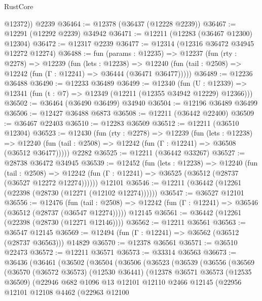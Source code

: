 \begin{lexlean}{RustCore}
\begin{coremodule}
        @12372))
    @2239
@36464 := @12378 (@36437 (@12228 @2239))
@36467 := @12291 (@12292 @2239) @34942
@36471 := @12211 (@12283 (@36467 @12300) @12304)
@36472 := @12317 @2239
@36477 := @12314 (@12316 @36472 @34945 @12272 @12274)
@36488 := fun (params : @12235) =>
  @12237
    (fun (rty : @2278) =>
    @12239
      (fun (lets : @12238) =>
      @12240 (fun (tail : @2508) => @12242 (fun (Γ : @12241) => @36444 (@36471 @36477)))))
@36489 := @12236 @36488
@36490 := @12233 @36489
@36499 := @12340
    (fun (U : @12339) => @12341 (fun (t : @7) => @12349 (@12211 (@12355 @34942 @12229) @12366)))
@36502 := @36464 (@36490 @36499) @34940
@36504 := @12196 @36489 @36499
@36506 := @12427 @36488 @6873
@36508 := @12211 (@36442 @22400)
@36509 := @36467 @22403
@36510 := @12283 @36509
@36512 := @12211 (@36510 @12304)
@36523 := @12430
    (fun (rty : @2278) =>
    @12239
      (fun (lets : @12238) =>
      @12240 (fun (tail : @2508) => @12242 (fun (Γ : @12241) => @36508 (@36512 @36477)))))
    @2282
@36525 := @12211 (@36442 @33267)
@36527 := @28738 @36472 @34945
@36539 := @12452
    (fun (lets : @12238) =>
    @12240
      (fun (tail : @2508) =>
      @12242 (fun (Γ : @12241) => @36525 (@36512 (@28737 (@36527 @12272 @12274))))))
    @12101
@36546 := @12211 (@36442 (@12261 (@22398 (@28730 (@12271 (@12102 @12274))))))
@36547 := @36527 @12101
@36556 := @12476
    (fun (tail : @2508) => @12242 (fun (Γ : @12241) => @36546 (@36512 (@28737 (@36547 @12274)))))
    @12145
@36561 := @36442 (@12261 (@22398 (@28730 (@12271 @12146))))
@36562 := @12211 @36561
@36563 := @36547 @12145
@36569 := @12494 (fun (Γ : @12241) => @36562 (@36512 (@28737 @36563))) @14829
@36570 := @12378 @36561
@36571 := @36510 @22473
@36572 := @12211 @36571
@36573 := @33314 @36563
@36673 := @36436
    (@36461
      (@36502
        (@36504
          (@36506
            (@36523
              (@36539
                (@36556
                  (@36569
                    (@36570
                      (@36572 @36573)
                      (@12530 @36441)
                      (@12378
                        @36571
                        @36573
                        (@12535 @36509)
                        (@22946
                          @682
                          @1096
                          @13
                          @12101
                          @12110
                          @2466
                          @12145
                          (@22956
                            @12101
                            @12108
                            @4462
                            (@22963
                              @12100

\end{coremodule}
\end{lexlean}
